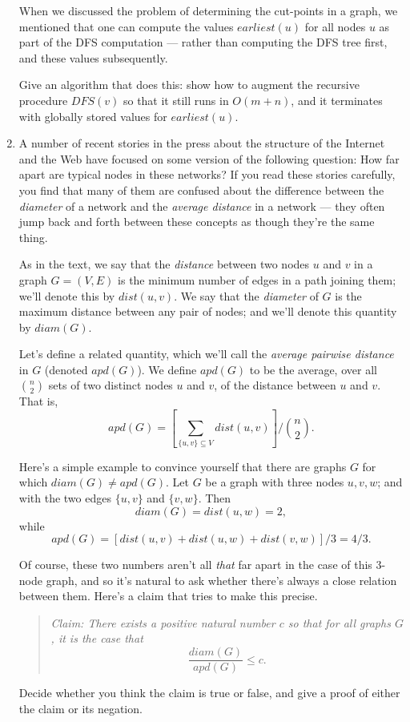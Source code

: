 \documentclass[12pt]{article}
\begin{document}
\begin{enumerate}
When we discussed the problem of determining the
cut-points in a graph,
we mentioned that one can compute the values
${earliest}(u)$ for all nodes $u$ as
part of the DFS computation --- rather than computing
the DFS tree first, and these values subsequently.

Give an algorithm that does this:
show how to augment the recursive procedure
$DFS(v)$ so that it still runs in $O(m + n)$,
and it terminates with globally stored values
for ${earliest}(u)$.


\item

A number of recent stories in the press about
the structure of the Internet and the Web
have focused on some version of the following question:
How far apart are typical nodes in these networks?
If you read these stories carefully,
you find that many of them are confused about the difference
between the {\em diameter} of a network and
the {\em average distance} in a network ---
they often jump back and forth between these
concepts as though they're the same thing.

As in the text, we say that the {\em distance} between
two nodes $u$ and $v$ in a graph $G = (V,E)$
is the minimum number
of edges in a path joining them;
we'll denote this by $dist(u,v)$.
We say that the
{\em diameter} of $G$ is the maximum distance between
any pair of nodes; and
we'll denote this quantity by $diam(G)$.

Let's define a related quantity, which we'll call
the {\em average pairwise distance} in $G$
(denoted $apd(G)$).
We define $apd(G)$ to be the average, over all ${n \choose 2}$
sets of two distinct nodes $u$ and $v$, of the distance
between $u$ and $v$.
That is,
$$apd(G) = \left[ \sum_{\{u, v\} \subseteq V} dist(u,v) \right] / {{n \choose 2}}.$$

Here's a simple example to convince yourself that there
are graphs $G$ for which $diam(G) \neq apd(G)$.
Let $G$ be a graph with three nodes $u, v, w$;
and with the two edges $\{u,v\}$ and $\{v,w\}$.
Then $$diam(G) = dist(u,w) = 2,$$
while
$$apd(G) = [dist(u,v) + dist(u,w) + dist(v,w)] / 3 = 4/3.$$

Of course, these two numbers aren't all {\em that} far apart
in the case of this 3-node graph, and so it's natural
to ask whether there's always a close relation between them.
Here's a claim that tries to make this precise.
\begin{quote}
{\em Claim: There exists a positive natural number $c$ so that
for all graphs $G$, it is the case that
$$\frac{diam(G)}{apd(G)} \leq c.$$}
\end{quote}
Decide whether you think the claim is true or false,
and give a proof of either the claim or its negation.


\end{enumerate}
\end{document}
